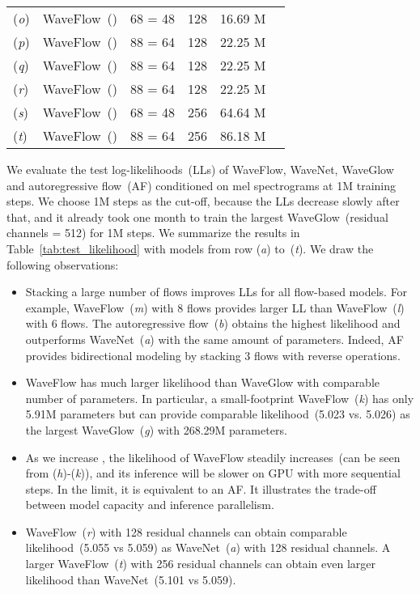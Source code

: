 \documentclass{article}
\begin{document}
\begin{table*}[t]
\begin{tabular}{l|l|r|r|r|c}
(\emph{o}) & WaveFlow~()     & 68 = 48  \qquad & 128 \qquad &  16.69 M \qquad &  \\ 
(\emph{p}) & WaveFlow~()     & 88 = 64  \qquad & 128 \qquad & 22.25 M \qquad &  \\ 
(\emph{q}) & WaveFlow~()    & 88 = 64  \qquad & 128 \qquad & 22.25 M \qquad &  \\ 
(\emph{r}) & WaveFlow~()    & 88 = 64  \qquad & 128 \qquad & 22.25 M \qquad &  \\ 
(\emph{s}) & WaveFlow~()    & 68 = 48  \qquad & 256 \qquad & 64.64 M \qquad &   \\
(\emph{t}) & WaveFlow~()    & 88 = 64  \qquad & 256 \qquad & 86.18 M  \qquad &   \\ \hline
\end{tabular}
\label{tab:test_likelihood}
\vspace{-.2em}
\end{table*}
We evaluate the test log-likelihoods~(LLs) of WaveFlow, WaveNet, WaveGlow  and autoregressive flow~(AF) conditioned on mel spectrograms at 1M training steps. 
We choose 1M steps as the cut-off, because the LLs decrease slowly after that, and it already took one month to train the largest WaveGlow~(residual channels = 512) for 1M steps.
We summarize the results in Table~\ref{tab:test_likelihood} with models from row (\emph{a}) to~(\emph{t}).
We draw the following observations:
\begin{itemize}[itemsep=0.00pt, topsep=0pt, leftmargin=1.25em]
    \vspace{-.2em}
    \item Stacking a large number of flows improves LLs for all flow-based models.
    For example, WaveFlow~(\emph{m}) with 8 flows provides larger LL than WaveFlow~(\emph{l}) with 6 flows.
    The autoregressive flow~(\emph{b}) obtains the highest likelihood and outperforms WaveNet~(\emph{a}) with the same amount of parameters. Indeed, AF provides bidirectional modeling by stacking 3 flows with reverse operations.
    \vspace{-.2em}
    \item WaveFlow has much larger likelihood than WaveGlow with comparable number of parameters.
     In particular, a small-footprint WaveFlow~(\emph{k}) has only 5.91M parameters but can provide comparable likelihood~(5.023 vs. 5.026) as the largest WaveGlow~(\emph{g}) with 268.29M parameters.
    \vspace{-.2em}
    \item As we increase , the likelihood of WaveFlow steadily increases~(can be seen from (\emph{h})-(\emph{k})), and its inference will be slower on GPU with more sequential steps. In the limit, it is equivalent to an AF. It illustrates the trade-off between model capacity and inference parallelism.
    \vspace{-.2em}
    \item WaveFlow~(\emph{r}) with 128 residual channels can obtain comparable likelihood~(5.055 vs 5.059)  as WaveNet~(\emph{a}) with 128 residual channels.
    A larger WaveFlow~(\emph{t}) with 256 residual channels can obtain even larger likelihood than WaveNet~(5.101 vs 5.059).
    \vspace{-.1em}
\end{itemize}
\end{document}
